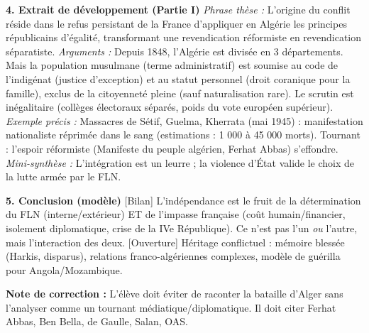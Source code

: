 \documentclass[11pt]{article}
\newcommand{\cle}[1]{{\popxbold\color{popdark}#1}}
\begin{document}
\begin{exoresolu}
\textbf{4. Extrait de développement (Partie I)}
\emph{Phrase thèse :} L'origine du conflit réside dans le refus persistant de la France d'appliquer en Algérie les principes républicains d'égalité, transformant une revendication réformiste en revendication séparatiste.
\emph{Arguments :} Depuis 1848, l'Algérie est divisée en 3 départements. Mais la population \cle{musulmane} (terme administratif) est soumise au \cle{code de l'indigénat} (justice d'exception) et au \cle{statut personnel} (droit coranique pour la famille), exclus de la citoyenneté pleine (sauf naturalisation rare). Le scrutin est inégalitaire (collèges électoraux séparés, poids du vote européen supérieur).
\emph{Exemple précis :} Massacres de \cle{Sétif, Guelma, Kherrata} (mai 1945) : manifestation nationaliste réprimée dans le sang (estimations : 1 000 à 45 000 morts). Tournant : l'espoir réformiste (Manifeste du peuple algérien, Ferhat Abbas) s'effondre.
\emph{Mini-synthèse :} L'intégration est un leurre ; la violence d'État valide le choix de la lutte armée par le FLN.

\textbf{5. Conclusion (modèle)}
[Bilan] L'indépendance est le fruit de la détermination du FLN (interne/extérieur) ET de l'impasse française (coût humain/financier, isolement diplomatique, crise de la IVe République). Ce n'est pas l'un \emph{ou} l'autre, mais l'interaction des deux. [Ouverture] Héritage conflictuel : mémoire blessée (Harkis, disparus), relations franco-algériennes complexes, modèle de \cle{guérilla} pour Angola/Mozambique.

\par \textbf{Note de correction :} L'élève doit éviter de raconter la bataille d'Alger sans l'analyser comme un tournant médiatique/diplomatique. Il doit citer \cle{Ferhat Abbas}, \cle{Ben Bella}, \cle{de Gaulle}, \cle{Salan}, \cle{OAS}.
\end{exoresolu}
\end{document}

